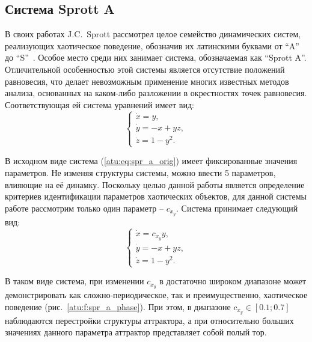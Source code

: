 
\FloatBarrier
\subsection{Система Sprott A}


В своих работах J.C.~Sprott рассмотрел целое семейство динамических
систем, реализующих хаотическое поведение, обозначив их латинскими буквами
от ``A'' до ``S''~\cite{sprott_212}. Особое место среди них
занимает система, обозначаемая как ``Sprott A''. Отличительной особенностью
этой системы является отсутствие положений равновесия, что делает
невозможным применение многих известных методов анализа, основанных на
каком-либо разложении в окрестностях точек равновесия. Соответствующая ей
система уравнений имеет вид:
%
\begin{equation}
  \begin{cases}
    \dot{x} =  y, \\
    \dot{y} = -x + yz, \\
    \dot{z} =  1 - y^2.
  \end{cases}
  \label{atu:eq:spr_a_orig}
\end{equation}


В исходном виде система (\ref{atu:eq:spr_a_orig}) имеет фиксированные значения параметров.
Не изменяя структуры системы, можно ввести 5 параметров, влияющие на её динамку.
Поскольку целью данной работы является определение критериев идентификации параметров
хаотических объектов, для данной системы
работе рассмотрим только один параметр -- $c_{x_y} $. Система принимает следующий вид:
%
\begin{equation}
  \begin{cases}
    \dot{x} =  c_{x_y} y, \\
    \dot{y} = -x + yz, \\
    \dot{z} =  1 - y^2.
  \end{cases}
  \label{atu:eq:spr_a}
\end{equation}

В таком виде система, при изменении $c_{x_y} $
в достаточно широком диапазоне может демонстрировать как
сложно-периодическое, так и преимущественно, хаотическое
поведение (рис.~\ref{atu:f:spr_a_phase}). При этом, в диапазоне $c_{x_y} \in [0.1 ; 0.7] $
наблюдаются перестройки структуры аттрактора, а при относительно больших
значениях данного параметра аттрактор представляет собой полый тор.


